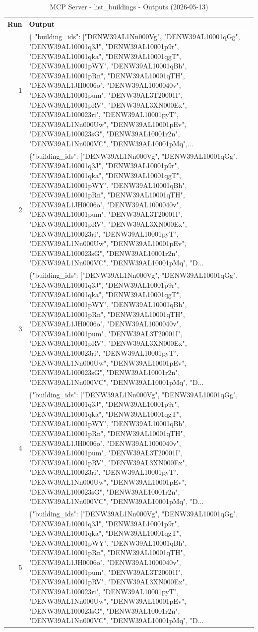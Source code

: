 \documentclass[a4paper,11pt]{article}
\begin{document}
\begin{table}[ht]
\centering
\scriptsize
\caption{MCP Server - list\_buildings - Outputs (2026-05-13)}
\label{tab:mcp\_list\_buildings\_outputs\_2026-05-13}
\begin{tabular}{r p{12cm}}
\hline
Run & Output \\
\hline
1 & \{
  "building\_ids": ["DENW39AL1Nn000Vg", "DENW39AL10001qGg", "DENW39AL10001q3J", "DENW39AL10001p9r", "DENW39AL10001qka", "DENW39AL10001qgT", "DENW39AL10001pWY", "DENW39AL10001qBh", "DENW39AL10001pRn", "DENW39AL10001qTH", "DENW39AL1JH0006o", "DENW39AL1000040v", "DENW39AL10001pum", "DENW39AL3T20001I", "DENW39AL10001pRV", "DENW39AL3XN000Ex", "DENW39AL100023ri", "DENW39AL10001pyT", "DENW39AL1Nn000Uw", "DENW39AL10001pEv", "DENW39AL100023sG", "DENW39AL10001r2n", "DENW39AL1Nn000VC", "DENW39AL10001pMq",... \\
2 & \{"building\_ids": ["DENW39AL1Nn000Vg", "DENW39AL10001qGg", "DENW39AL10001q3J", "DENW39AL10001p9r", "DENW39AL10001qka", "DENW39AL10001qgT", "DENW39AL10001pWY", "DENW39AL10001qBh", "DENW39AL10001pRn", "DENW39AL10001qTH", "DENW39AL1JH0006o", "DENW39AL1000040v", "DENW39AL10001pum", "DENW39AL3T20001I", "DENW39AL10001pRV", "DENW39AL3XN000Ex", "DENW39AL100023ri", "DENW39AL10001pyT", "DENW39AL1Nn000Uw", "DENW39AL10001pEv", "DENW39AL100023sG", "DENW39AL10001r2n", "DENW39AL1Nn000VC", "DENW39AL10001pMq", "D... \\
3 & \{"building\_ids": ["DENW39AL1Nn000Vg", "DENW39AL10001qGg", "DENW39AL10001q3J", "DENW39AL10001p9r", "DENW39AL10001qka", "DENW39AL10001qgT", "DENW39AL10001pWY", "DENW39AL10001qBh", "DENW39AL10001pRn", "DENW39AL10001qTH", "DENW39AL1JH0006o", "DENW39AL1000040v", "DENW39AL10001pum", "DENW39AL3T20001I", "DENW39AL10001pRV", "DENW39AL3XN000Ex", "DENW39AL100023ri", "DENW39AL10001pyT", "DENW39AL1Nn000Uw", "DENW39AL10001pEv", "DENW39AL100023sG", "DENW39AL10001r2n", "DENW39AL1Nn000VC", "DENW39AL10001pMq", "D... \\
4 & \{"building\_ids": ["DENW39AL1Nn000Vg", "DENW39AL10001qGg", "DENW39AL10001q3J", "DENW39AL10001p9r", "DENW39AL10001qka", "DENW39AL10001qgT", "DENW39AL10001pWY", "DENW39AL10001qBh", "DENW39AL10001pRn", "DENW39AL10001qTH", "DENW39AL1JH0006o", "DENW39AL1000040v", "DENW39AL10001pum", "DENW39AL3T20001I", "DENW39AL10001pRV", "DENW39AL3XN000Ex", "DENW39AL100023ri", "DENW39AL10001pyT", "DENW39AL1Nn000Uw", "DENW39AL10001pEv", "DENW39AL100023sG", "DENW39AL10001r2n", "DENW39AL1Nn000VC", "DENW39AL10001pMq", "D... \\
5 & \{"building\_ids": ["DENW39AL1Nn000Vg", "DENW39AL10001qGg", "DENW39AL10001q3J", "DENW39AL10001p9r", "DENW39AL10001qka", "DENW39AL10001qgT", "DENW39AL10001pWY", "DENW39AL10001qBh", "DENW39AL10001pRn", "DENW39AL10001qTH", "DENW39AL1JH0006o", "DENW39AL1000040v", "DENW39AL10001pum", "DENW39AL3T20001I", "DENW39AL10001pRV", "DENW39AL3XN000Ex", "DENW39AL100023ri", "DENW39AL10001pyT", "DENW39AL1Nn000Uw", "DENW39AL10001pEv", "DENW39AL100023sG", "DENW39AL10001r2n", "DENW39AL1Nn000VC", "DENW39AL10001pMq", "D... \\

\end{tabular}
\end{table}
\end{document}
